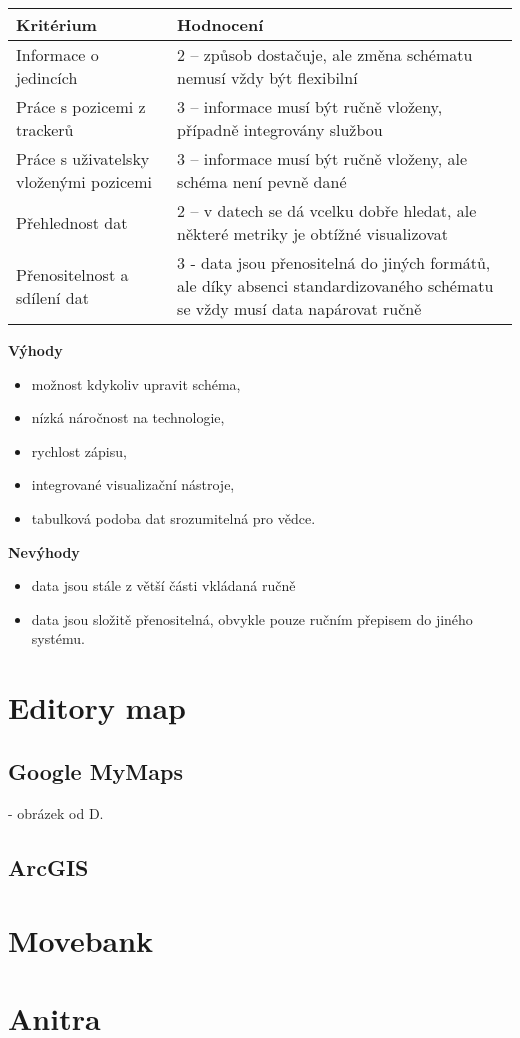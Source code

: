 \begin{table}[h]
	\begin{tabular}{ l | l }
		Kritérium                              & Hodnocení \\
		\hline			
		Informace o jedincích                  & 2 -- způsob dostačuje, ale změna schématu nemusí vždy být flexibilní          \\
		Práce s pozicemi z trackerů            & 3 -- informace musí být ručně vloženy, případně integrovány službou          \\
		Práce s uživatelsky vloženými pozicemi & 3 -- informace musí být ručně vloženy, ale schéma není pevně dané          \\
		Přehlednost dat                        & 2 -- v datech se dá vcelku dobře hledat, ale některé metriky je obtížné visualizovat          \\
		Přenositelnost a sdílení dat           & 3 - data jsou přenositelná do jiných formátů, ale díky absenci standardizovaného schématu se vždy musí data napárovat ručně          \\
		\hline	
	\end{tabular}
\end{table}

\textbf{Výhody}

\begin{itemize}
	\item možnost kdykoliv upravit schéma,
	\item nízká náročnost na technologie,
	\item rychlost zápisu,
	\item integrované visualizační nástroje,
	\item tabulková podoba dat srozumitelná pro vědce.
\end{itemize}

\textbf{Nevýhody}

\begin{itemize}
	\item data jsou stále z větší části vkládaná ručně
	\item data jsou složitě přenositelná, obvykle pouze ručním přepisem do jiného systému.
\end{itemize}

\section{Editory map}

\subsection{Google MyMaps}

- obrázek od D.

\subsection{ArcGIS}

\section{Movebank}

\section{Anitra}